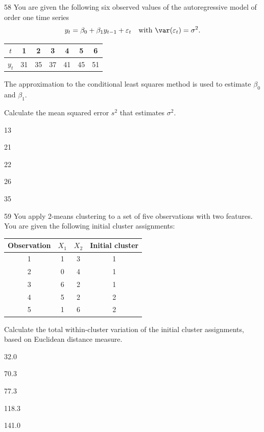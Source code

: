 \begin{question}{58}
You are given the following six observed values of the autoregressive model of order one time series
\[ y_t = \beta_0 + \beta_1 y_{t-1} + \varepsilon_t \quad \text{with}\ \var(\varepsilon_t) = \sigma^2. \]
\begin{center}
\begin{tabular}{|c|c|c|c|c|c|c|}
\hline
$t$   & 1  & 2  & 3  & 4  & 5  & 6  \\ \hline
$y_t$ & 31 & 35 & 37 & 41 & 45 & 51 \\ \hline
\end{tabular}
\end{center}

The approximation to the conditional least squares method is used to estimate $\beta_0$ and $\beta_1$.

Calculate the mean squared error $s^2$ that estimates $\sigma^2$.

\begin{choices}
\item 13
\item 21
\item 22
\item 26
\item 35
\end{choices}
\end{question}

\begin{question}{59}
You apply 2-means clustering to a set of five observations with two features. You are given the following initial cluster assignments:
\begin{center}
\begin{tabular}{|c|c|c|c|}
\hline
Observation & $X_1$ & $X_2$ & Initial cluster \\ \hline
1 & 1 & 3 & 1 \\ \hline
2 & 0 & 4 & 1 \\ \hline
3 & 6 & 2 & 1 \\ \hline
4 & 5 & 2 & 2 \\ \hline
5 & 1 & 6 & 2 \\ \hline
\end{tabular}
\end{center}

Calculate the total within-cluster variation of the initial cluster assignments, based on Euclidean distance measure.

\begin{choices}
\item 32.0
\item 70.3
\item 77.3
\item 118.3
\item 141.0
\end{choices}
\end{question}

